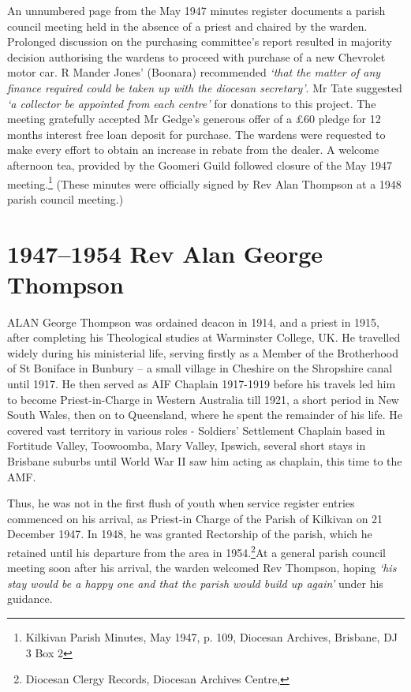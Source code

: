An unnumbered page from the May 1947 minutes register documents a parish council meeting held in the absence of a priest and chaired by the warden. Prolonged discussion on the purchasing committee's report resulted in majority decision authorising the wardens to proceed with purchase of a new Chevrolet motor car. R Mander Jones' (Boonara) recommended \emph{`that the matter of any finance required could be taken up with the diocesan secretary'}. Mr Tate suggested \emph{`a collector be appointed from each centre'} for donations to this project. The meeting gratefully accepted Mr Gedge's generous offer of a \pounds60 pledge for 12 months interest free loan deposit for purchase. The wardens were requested to make every effort to obtain an increase in rebate from the dealer. A welcome afternoon tea, provided by the Goomeri Guild followed closure of the May 1947 meeting.\footnote{Kilkivan Parish Minutes, May 1947, p. 109, Diocesan Archives, Brisbane, DJ 3 Box 2} (These minutes were officially signed by Rev Alan Thompson at a 1948 parish council meeting.)


\balance


\printendnotes[custom]
\setcounter{endnote}{0}
\chapter{1947--1954 Rev Alan George Thompson}
\nobalance


\lettrine[lines=3]{A}{LAN}
 George Thompson was ordained deacon in 1914, and a priest in 1915, after completing his Theological studies at Warminster College, UK. He travelled widely during his ministerial life, serving firstly as a Member of the Brotherhood of St Boniface in Bunbury -- a small village in Cheshire on the Shropshire canal until 1917. He then served as AIF Chaplain 1917-1919 before his travels led him to become Priest-in-Charge in Western Australia till 1921, a short period in New South Wales, then on to Queensland, where he spent the remainder of his life. He covered vast territory in various roles - Soldiers' Settlement Chaplain based in Fortitude Valley, Toowoomba, Mary Valley, Ipswich, several short stays in Brisbane suburbs until World War II saw him acting as chaplain, this time to the AMF.

Thus, he was not in the first flush of youth when service register entries commenced on his arrival, as Priest-in Charge of the Parish of Kilkivan on 21 December 1947. In 1948, he was granted Rectorship of the parish, which he retained until his departure from the area in 1954.\footnote{Diocesan Clergy Records, Diocesan Archives Centre,}At a general parish council meeting soon after his arrival, the warden welcomed Rev Thompson, hoping \emph{`his stay would be a happy one and that the parish would build up again'} under his guidance.


